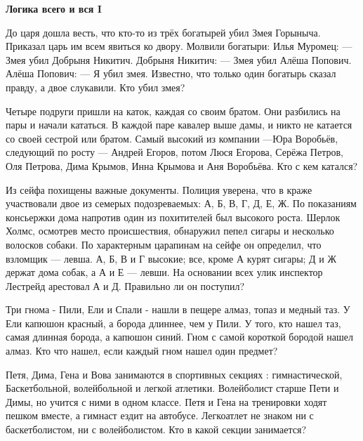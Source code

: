 \centerline{\bf \Huge Логика всего и вся I}

 До царя дошла весть, что кто-то из трёх богатырей убил Змея Горыныча. Приказал царь им всем явиться ко двору. Молвили богатыри: Илья Муромец: — Змея убил Добрыня Никитич. Добрыня Никитич: — Змея убил Алёша Попович. Алёша Попович: — Я убил змея. Известно, что только один богатырь сказал правду, а двое слукавили. Кто убил змея?


 Четыре подруги пришли на каток, каждая со своим братом. Они разбились на пары и начали кататься. В каждой паре кавалер выше дамы, и никто не катается со своей сестрой или братом. Самый высокий из компании —Юра Воробьёв, следующий по росту — Андрей Егоров, потом Люся Егорова, Серёжа Петров, Оля Петрова, Дима Крымов, Инна Крымова и Аня Воробьёва. Кто с кем катался?



 Из сейфа похищены важные документы. Полиция уверена, что в краже участвовали двое из семерых подозреваемых: А, Б, В, Г, Д, Е, Ж. По показаниям консьержки дома напротив один из похитителей был высокого роста. Шерлок Холмс, осмотрев место происшествия, обнаружил пепел сигары и несколько волосков собаки. По характерным царапинам на сейфе он определил, что взломщик — левша. А, Б, В и Г высокие; все, кроме А курят сигары; Д и Ж держат дома собак, а А и Е — левши. На основании всех улик инспектор Лестрейд арестовал А и Д. Правильно ли он поступил?


Три гнома - Пили, Ели и Спали - нашли в пещере алмаз, топаз и медный таз. У Ели капюшон красный, а борода длиннее, чем у Пили. У того, кто нашел таз, самая длинная борода, а капюшон синий. Гном с самой короткой бородой нашел алмаз. Кто что нашел, если каждый гном нашел один предмет?



Петя, Дима, Гена и Вова занимаются в спортивных секциях : гимнастической, Баскетбольной, волейбольной и легкой атлетики. Волейболист старше Пети и Димы, но учится с ними в одном классе. Петя и Гена на тренировки ходят пешком вместе, а гимнаст ездит на автобусе. Легкоатлет не знаком ни с баскетболистом, ни с волейболистом. Кто в какой секции занимается?

